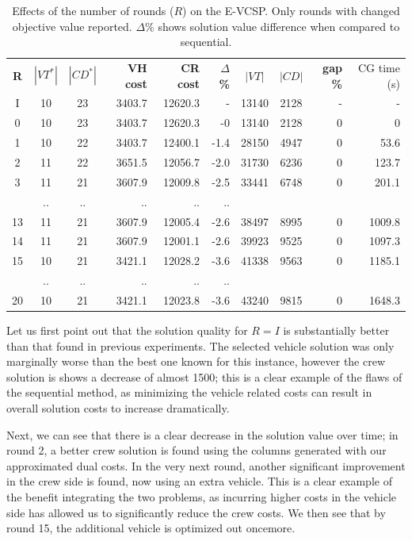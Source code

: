\documentclass[]{article}
\begin{document}
\begin{table}[h]
  \centering
  \begin{tabular}{cccrrrccrr}
    \toprule
       \textbf{R} & $|VT^*|$ & $|CD^*|$ & \textbf{VH cost} & \textbf{CR cost} & \textbf{$\Delta$\%} & $|VT|$ & $|CD|$ & \textbf{gap \%} & CG time (s) \\
       \cmidrule(lr){1-1} \cmidrule(lr){2-6} \cmidrule(lr){7-8} \cmidrule(lr){9-10}
        I   & 10 & 23 & 3403.7 & 12620.3 & -    & 13140 & 2128 & - & -      \\
        0   & 10 & 23 & 3403.7 & 12620.3 & -0    & 13140 & 2128 & 0 & 0      \\
        1   & 10 & 22 & 3403.7 & 12400.1 & -1.4  & 28150 & 4947 & 0 & 53.6   \\
        2   & 11 & 22 & 3651.5 & 12056.7 & -2.0    & 31730 & 6236 & 0 & 123.7  \\
        3   & 11 & 21 & 3607.9 & 12009.8 & -2.5  & 33441 & 6748 & 0 & 201.1  \\
            & .. & .. & .. & .. & .. & \\
        13  & 11 & 21 & 3607.9 & 12005.4 & -2.6  & 38497 & 8995 & 0 & 1009.8 \\
        14  & 11 & 21 & 3607.9 & 12001.1 & -2.6  & 39923 & 9525 & 0 & 1097.3 \\
        15  & 10 & 21 & 3421.1 & 12028.2 & -3.6  & 41338 & 9563 & 0 & 1185.1 \\
            & .. & .. & .. & .. & .. & \\
        20  & 10 & 21 & 3421.1 & 12023.8 & -3.6  & 43240 & 9815 & 0 & 1648.3 \\
        \bottomrule
  \end{tabular}
  \caption{Effects of the number of rounds ($R$) on the E-VCSP. Only rounds with changed objective value reported. $\Delta$\% shows solution value difference when compared to sequential. }
  \label{tab:evcsp-rounds}
\end{table}
Let us first point out that the solution quality for $R=I$ is substantially better than that found in previous experiments. The selected vehicle solution was only marginally worse than the best one known for this instance, however the crew solution is shows a decrease of almost 1500; this is a clear example of the flaws of the sequential method, as minimizing the vehicle related costs can result in overall solution costs to increase dramatically.

Next, we can see that there is a clear decrease in the solution value over time; in round 2, a better crew solution is found using the columns generated with our approximated dual costs. In the very next round, another significant improvement in the crew side is found, now using an extra vehicle. This is a clear example of the benefit integrating the two problems, as incurring higher costs in the vehicle side has allowed us to significantly reduce the crew costs. We then see that by round 15, the additional vehicle is optimized out oncemore. 
\end{document}

